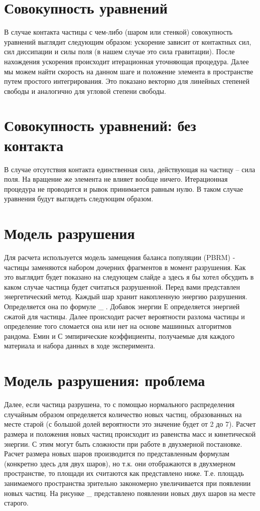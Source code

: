 \documentclass[a4paper]{article}
\begin{document}
\section{Совокупность уравнений}

В случае контакта частицы с чем-либо (шаром или стенкой) совокупность уравнений выглядит следующим образом: ускорение зависит от контактных сил, сил диссипации и силы поля (в нашем случае это сила гравитации).
После нахождения ускорения происходит итерационная уточняющая процедура.
Далее мы можем найти скорость на данном шаге и положение элемента в пространстве путем простого интегрирования.
Это показано векторно для линейных степеней свободы и аналогично для угловой степени свободы.

\section{Совокупность уравнений: без контакта}

В случае отсутствия контакта единственная сила, действующая на частицу -- сила поля.
На вращение же элемента не влияет вообще ничего.
Итерационная процедура не проводится и рывок принимается равным нулю.
В таком случае уравнения будут выглядеть следующим образом.

\section{Модель разрушения}

Для расчета используется модель замещения баланса популяции (PBRM) - частицы заменяются набором дочерних фрагментов в момент разрушения. 
Как это выглядит будет показано на следующем слайде а здесь я бы хотел обсудить в каком случае частица будет считаться разрушенной.
Перед вами представлен энергетический метод.
Каждый шар хранит накопленную энергию разрушения.
Определяется она по формуле \_ .
Добавок энергии Е определяется энергией сжатой для частицы.
Далее происходит расчет вероятности разлома частицы и определение того сломается она или нет на основе машинных алгоритмов рандома.
Емин и С эмпирические коэффициенты, получаемые для каждого материала и набора данных в ходе эксперимента.

\section{Модель разрушения: проблема}

Далее, если частица разрушена, то с помощью нормального распределения случайным образом определяется количество новых частиц, образованных на месте старой (с большой долей вероятности это значение будет от 2 до 7).
Расчет размера и положения новых частиц происходит из равенства масс и кинетической энергии.
С этим могут быть сложности при работе в двухмерной постановке.
Расчет размера новых шаров производится по представленным формулам (конкретно здесь для двух шаров), но т.к. они отображаются в двухмерном пространстве, то площади их считаются как представлено ниже.
Т.е. площадь занимаемого пространства зрительно закономерно увеличивается при появлении новых частиц.
На рисунке \_ представлено появлении новых двух шаров на месте старого.
\end{document}
